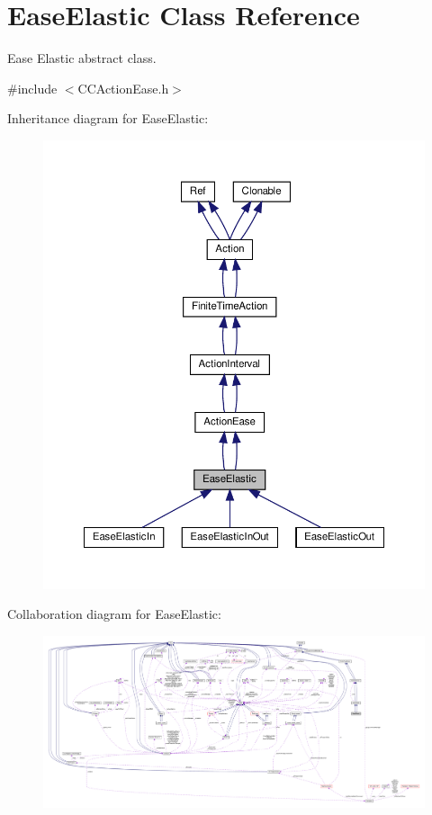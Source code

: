 \hypertarget{classEaseElastic}{}\section{Ease\+Elastic Class Reference}
\label{classEaseElastic}


Ease Elastic abstract class.  




{\ttfamily \#include $<$C\+C\+Action\+Ease.\+h$>$}



Inheritance diagram for Ease\+Elastic\+:
\nopagebreak
\begin{figure}[H]
\begin{center}
\leavevmode
\includegraphics[width=350pt]{classEaseElastic__inherit__graph}
\end{center}
\end{figure}


Collaboration diagram for Ease\+Elastic\+:
\nopagebreak
\begin{figure}[H]
\begin{center}
\leavevmode
\includegraphics[width=350pt]{classEaseElastic__coll__graph}
\end{center}
\end{figure}

